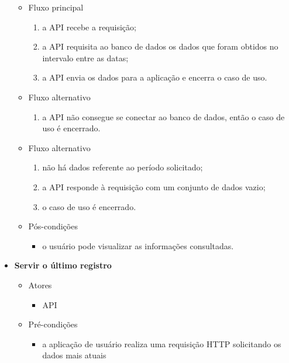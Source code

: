 \begin{itemize}
\begin{itemize}
			\item Fluxo principal
   	 			\begin{enumerate}
		     	   \item a API recebe a requisição;
			        \item a API requisita ao banco de dados os dados que foram obtidos no intervalo entre as datas;
		    	    \item a API envia os dados para a aplicação e encerra o caso de uso.
		   		 \end{enumerate}

			\item Fluxo alternativo
		    	\begin{enumerate}
			        \item a API não consegue se conectar ao banco de dados, então o caso de uso é encerrado.
		    	\end{enumerate}
    		
    		\item Fluxo alternativo
		    	\begin{enumerate}
			        \item não há dados referente ao período solicitado;
			        \item a API responde à requisição com um conjunto de dados vazio;
			        \item o caso de uso é encerrado.
		    	\end{enumerate}
		    	
		    \item Pós-condições
			    \begin{itemize}
        			\item o usuário pode visualizar as informações consultadas.
		    	\end{itemize}
		\end{itemize}
		
	\item \textbf{Servir o último registro}

		\begin{itemize}
    		\item Atores
			    \begin{itemize}
    	    		\item API
			    \end{itemize}

		    \item Pré-condições
			    \begin{itemize}
     		   		\item a aplicação de usuário realiza uma requisição HTTP solicitando os dados mais atuais
			    \end{itemize}


\end{itemize}
\end{itemize}
